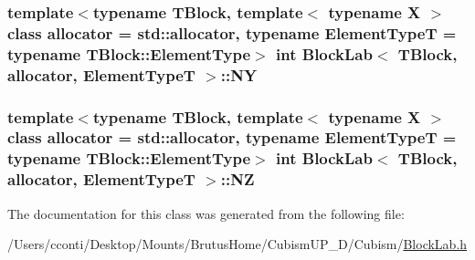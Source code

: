 \subsubsection[{N\+Y}]{\setlength{\rightskip}{0pt plus 5cm}template$<$typename T\+Block, template$<$ typename X $>$ class allocator = std\+::allocator, typename Element\+Type\+T = typename T\+Block\+::\+Element\+Type$>$ int {\bf Block\+Lab}$<$ T\+Block, allocator, Element\+Type\+T $>$\+::N\+Y\hspace{0.3cm}{\ttfamily [protected]}}\label{class_block_lab_aaa1e748664ebb6b4fc7c47cf30a445db}
\hypertarget{class_block_lab_acdd7f4e2489d31da6a2a76099807a7c5}{}
\subsubsection[{N\+Z}]{\setlength{\rightskip}{0pt plus 5cm}template$<$typename T\+Block, template$<$ typename X $>$ class allocator = std\+::allocator, typename Element\+Type\+T = typename T\+Block\+::\+Element\+Type$>$ int {\bf Block\+Lab}$<$ T\+Block, allocator, Element\+Type\+T $>$\+::N\+Z\hspace{0.3cm}{\ttfamily [protected]}}\label{class_block_lab_acdd7f4e2489d31da6a2a76099807a7c5}


The documentation for this class was generated from the following file\+:\begin{DoxyCompactItemize}
\item 
/\+Users/cconti/\+Desktop/\+Mounts/\+Brutus\+Home/\+Cubism\+U\+P\+\_\+D/\+Cubism/\hyperlink{_block_lab_8h}{Block\+Lab.\+h}\end{DoxyCompactItemize}
